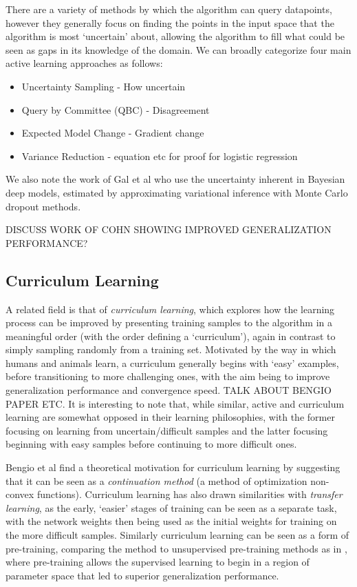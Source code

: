 \documentclass[a4paper,11pt]{article}
\begin{document}
There are a variety of methods by which the algorithm can query datapoints, however they generally focus on finding the points in the input space that the algorithm is most `uncertain' about, allowing the algorithm to fill what could be seen as gaps in its knowledge of the domain. We can broadly categorize four main active learning approaches as follows:
\begin{itemize}
\item Uncertainty Sampling - How uncertain
\item Query by Committee (QBC) - Disagreement
\item Expected Model Change - Gradient change
\item Variance Reduction - equation etc for proof for logistic regression
\end{itemize}
We also note the work of Gal et al \cite{Gal 2016 2} who use the uncertainty inherent in Bayesian deep models, estimated by approximating variational inference with Monte Carlo dropout methods.

DISCUSS WORK OF COHN SHOWING IMPROVED GENERALIZATION PERFORMANCE?

\subsection*{Curriculum Learning}
A related field is that of \textit{curriculum learning}, which explores how the learning process can be improved by presenting training samples to the algorithm in a meaningful order (with the order defining a `curriculum'), again in contrast to simply sampling randomly from a training set. Motivated by the way in which humans and animals learn, a curriculum generally begins with `easy' examples, before transitioning to more challenging ones, with the aim being to improve generalization performance and convergence speed. TALK ABOUT BENGIO PAPER ETC. It is interesting to note that, while similar, active and curriculum learning are somewhat opposed in their learning philosophies, with the former focusing on learning from uncertain/difficult samples and the latter focusing beginning with easy samples before continuing to more difficult ones. 

Bengio et al \cite{Bengio 09} find a theoretical motivation for curriculum learning by suggesting that it can be seen as a \textit{continuation method} (a method of optimization non-convex functions). Curriculum learning has also drawn similarities with \textit{transfer learning}, as the early, `easier' stages of training can be seen as a separate task, with the network weights then being used as the initial weights for training on the more difficult samples. Similarly curriculum learning can be seen as a form of pre-training, comparing the method to unsupervised pre-training methods as in \cite{Erhan 09}, where pre-training allows the supervised learning to begin in a region of parameter space that led to superior generalization performance. 
\end{document}
